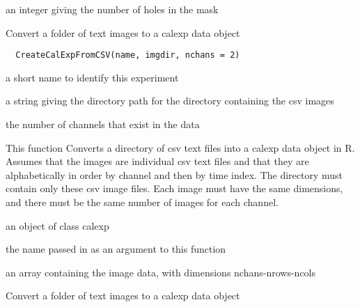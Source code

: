 \documentclass[a4paper]{book}
\begin{document}
%
\begin{Value}
an integer giving the number of holes in the mask
\end{Value}
%
\begin{Description}\relax
Convert a folder of text images to a calexp data object
\end{Description}
%
\begin{Usage}
\begin{verbatim}
  CreateCalExpFromCSV(name, imgdir, nchans = 2)
\end{verbatim}
\end{Usage}
%
\begin{Arguments}
\begin{ldescription}
\item[\code{name}] a short name to identify this experiment

\item[\code{imgdir}] a string giving the directory path for the
directory containing the csv images

\item[\code{nchans}] the number of channels that exist in the
data
\end{ldescription}
\end{Arguments}
%
\begin{Details}\relax
This function Converts a directory of csv text files into
a calexp data object in R. Assumes that the images are
individual csv text files and that they are
alphabetically in order by channel and then by time
index.  The directory must contain only these csv image
files. Each image must have the same dimensions, and
there must be the same number of images for each channel.
\end{Details}
%
\begin{Value}
an object of class calexp \begin{ldescription}
\item[\code{name}] the name passed in
as an argument to this function\item[\code{data}] an array
containing the image data, with dimensions
nchans-nrows-ncols
\end{ldescription}
\end{Value}
%
\begin{Description}\relax
Convert a folder of text images to a calexp data object
\end{Description}
\end{document}
